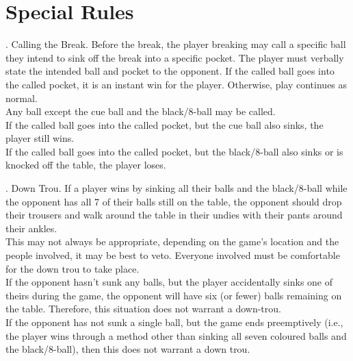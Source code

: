 \documentclass[a4paper, twocolumn]{article}
\def\PageTopMargin{2cm}
\def\PageLeftMargin{2cm}
\newcommand\atxy[3]{%
 \AddThispageHook{\smash{\hspace*{\dimexpr-\PageLeftMargin-\hoffset+#1\relax}%
  \raisebox{\dimexpr\PageTopMargin+\voffset-#2\relax}{#3}}}}
\newcommand{\itemspace}{\vspace{1.2mm}\\}
\newcommand{\placeframe}[1]{\atxy{-0.5cm}{29.1cm}{\texttt{[image: images/frame\#1]}}}
\begin{document}
\section{Special Rules} \label{special}
\ex. \label{callingthebreak} Calling the Break. Before the break, the player breaking may call a specific ball they intend to sink off the break into a specific pocket. The player must verbally state the intended ball and pocket to the opponent. If the called ball goes into the called pocket, it is an instant win for the player. Otherwise, play continues as normal.\itemspace Any ball except the cue ball and the black/8-ball may be called.\itemspace If the called ball goes into the called pocket, but the cue ball also sinks, the player still wins.\itemspace If the called ball goes into the called pocket, but the black/8-ball also sinks or is knocked off the table, the player loses.\par
\ex. Down Trou. If a player wins by sinking all their balls and the black/8-ball while the opponent has all 7 of their balls still on the table, the opponent should drop their trousers and walk around the table in their undies with their pants around their ankles.\itemspace This may not always be appropriate, depending on the game's location and the people involved, it may be best to veto. Everyone involved must be comfortable for the down trou to take place.\itemspace If the opponent hasn’t sunk any balls, but the player accidentally sinks one of theirs during the game, the opponent will have six (or fewer) balls remaining on the table. Therefore, this situation does not warrant a down-trou.\itemspace If the opponent has not sunk a single ball, but the game ends preemptively (i.e., the player wins through a method other than sinking all seven coloured balls and the black/8-ball), then this does not warrant a down trou.\par

\placeframe{3}
\end{document}
